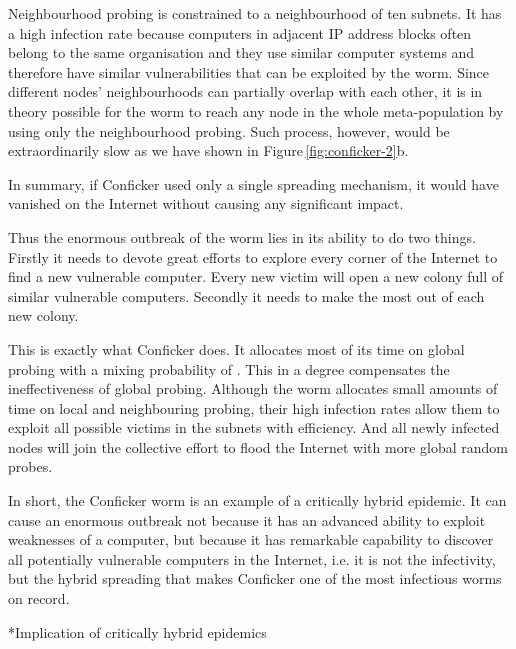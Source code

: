 \documentclass[9pt]{article}
\makeatletter
\newcommand{\reffig}[1]{Figure\,\ref{#1}}
\renewcommand{\subsection}{\@startsection {subsection}{2}{0pt}{-6pt}{1pt}{\reset@font \normalsize \bfseries}}
\makeatother
\begin{document}
{Neighbourhood probing is constrained to a neighbourhood of ten subnets. 
It has a high infection rate because computers in adjacent IP address blocks often belong to the same organisation and they use similar computer systems and therefore have similar vulnerabilities that can be exploited by the worm. 
Since different nodes' neighbourhoods can partially overlap with each other, it is in theory possible for the worm to reach any node in the whole meta-population by using only the neighbourhood probing. Such process, however, would be extraordinarily slow as we have shown in \reffig{fig:conficker-2}b. 

In summary, if Conficker used only a single spreading mechanism, it would have vanished on the Internet without causing any significant impact. 

Thus the enormous outbreak of the worm lies in its ability to do two things. Firstly it needs to devote great efforts to explore every corner of the Internet to find a new vulnerable computer. Every new victim will open a new colony full of similar vulnerable computers. Secondly it needs to make the most out of each new colony. 

This is exactly what Conficker does. It allocates most of its time on global probing with a mixing probability of . This in a degree compensates the ineffectiveness of global probing. 
Although the worm allocates small amounts of time on local and neighbouring probing, their high infection rates allow them to exploit all possible victims in the subnets with efficiency. And all newly infected nodes will join the collective effort to flood the Internet with more global random probes. 

In short, the Conficker worm is an example of a critically hybrid epidemic. It can cause an enormous outbreak not because it has an advanced ability to exploit weaknesses of a computer, but because it has remarkable capability to discover all potentially vulnerable computers in the Internet, i.e. it is not the infectivity, but the hybrid spreading that makes Conficker one of the most infectious worms on record. 

\subsection*{Implication of critically hybrid epidemics}

}
\end{document}
